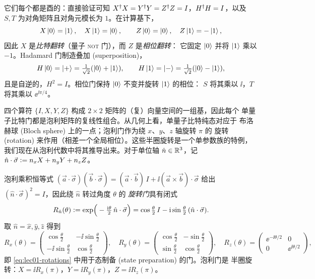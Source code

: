 它们每个都是酉的：直接验证可知 $X^{\dagger} X=Y^{\dagger} Y=Z^{\dagger} Z=I$，$H^{\dagger} H=I$，以及
$S,T$ 为对角矩阵且对角元模长为 $1$。在计算基下，
\[
  X\ket{0}=\ket{1},\quad X\ket{1}=\ket{0},\qquad
  Z\ket{0}=\ket{0},\quad Z\ket{1}=-\ket{1},
\]
因此 $X$ 是\emph{比特翻转}（量子 \textsc{not} 门），而 $Z$ 是\emph{相位翻转}：
它固定 $\ket{0}$ 并将 $\ket{1}$ 乘以 $-1$。Hadamard 门制造叠加 (superposition)，
\[
  H\ket{0}=\ket{+}=\tfrac{1}{\sqrt{2}}(\ket{0}+\ket{1}),\qquad
  H\ket{1}=\ket{-}=\tfrac{1}{\sqrt{2}}(\ket{0}-\ket{1}),
\]
且是自逆的，$H^{2}=I$。相位门保持 $\ket{0}$ 不变并旋转 $\ket{1}$ 的相位：
$S$ 将其乘以 $\ii$，$T$ 将其乘以 $\ee^{\ii\pi/4}$。

四个算符 $\{I,X,Y,Z\}$ 构成 $2\times2$ 矩阵的（复）向量空间的一组基，因此每个
单量子比特门都是泡利矩阵的复线性组合。从几何上看，单量子比特纯态对应于
布洛赫球 (Bloch sphere) 上的一点；泡利门作为绕 $x$、$y$、$z$ 轴旋转 $\pi$ 的
旋转 (rotation) 来作用（相差一个全局相位）。这些半圈旋转是一个单参数族的特例，
我们现在从泡利代数中将其推导出来。对于单位轴 $\hat n\in\mathbb{R}^{3}$，记
$\hat n\cdot\vec\sigma\vcentcolon= n_xX+n_yY+n_zZ$。

\begin{proposition}[旋转门及其泡利生成元]\label{prop:lec01-rot}
泡利乘积恒等式
$(\vec a\cdot\vec\sigma)(\vec b\cdot\vec\sigma)=(\vec a\cdot\vec b)\,I+\ii(\vec a\times\vec b)\cdot\vec\sigma$
给出 $(\hat n\cdot\vec\sigma)^{2}=I$，因此绕 $\hat n$ 转过角度 $\theta$ 的
\emph{旋转门}具有闭式
\[
  R_{\hat n}(\theta)\vcentcolon=\exp\!\Big(-\tfrac{\mathrm{i}\theta}{2}\,\hat n\cdot\vec\sigma\Big)
  =\cos\tfrac{\theta}{2}\,I-\mathrm{i}\sin\tfrac{\theta}{2}\,(\hat n\cdot\vec\sigma).
\]
取 $\hat n=\hat x,\hat y,\hat z$ 得到
\[
  R_x(\theta)=\begin{pmatrix}\cos\tfrac{\theta}{2}&-\ii\sin\tfrac{\theta}{2}\\[2pt]
      -\ii\sin\tfrac{\theta}{2}&\cos\tfrac{\theta}{2}\end{pmatrix},\quad
  R_y(\theta)=\begin{pmatrix}\cos\tfrac{\theta}{2}&-\sin\tfrac{\theta}{2}\\[2pt]
      \sin\tfrac{\theta}{2}&\cos\tfrac{\theta}{2}\end{pmatrix},\quad
  R_z(\theta)=\begin{pmatrix}\ee^{-\ii\theta/2}&0\\0&\ee^{\ii\theta/2}\end{pmatrix},
\]
即 \eqref{eq:lec01-rotations} 中用于态制备 (state preparation) 的门。泡利门是
半圈旋转：$X=\ii R_x(\pi)$，$Y=\ii R_y(\pi)$，$Z=\ii R_z(\pi)$。
\end{proposition}

